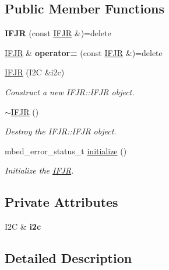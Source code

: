 \subsection*{Public Member Functions}
\begin{DoxyCompactItemize}
\item 
\mbox{\label{class_i_f_j_r_acd1ff6164e8cf8100df187b0abc4e654}} 
{\bfseries I\+F\+JR} (const \mbox{\hyperlink{class_i_f_j_r}{I\+F\+JR}} \&)=delete
\item 
\mbox{\label{class_i_f_j_r_a3d8ba875c73612ed2d426ba80d224c87}} 
\mbox{\hyperlink{class_i_f_j_r}{I\+F\+JR}} \& {\bfseries operator=} (const \mbox{\hyperlink{class_i_f_j_r}{I\+F\+JR}} \&)=delete
\item 
\mbox{\hyperlink{class_i_f_j_r_a1905b6c95f25b84526531afcfeb38b93}{I\+F\+JR}} (I2C \&i2c)
\begin{DoxyCompactList}\small\item\em Construct a new I\+F\+J\+R\+::\+I\+F\+JR object. \end{DoxyCompactList}\item 
\mbox{\hyperlink{class_i_f_j_r_a02cc4eb03b4a7fdacbdb8e7f940b7daa}{$\sim$\+I\+F\+JR}} ()
\begin{DoxyCompactList}\small\item\em Destroy the I\+F\+J\+R\+::\+I\+F\+JR object. \end{DoxyCompactList}\item 
mbed\+\_\+error\+\_\+status\+\_\+t \mbox{\hyperlink{class_i_f_j_r_a0a7d913d00e8573b613b980f17ed2fd4}{initialize}} ()
\begin{DoxyCompactList}\small\item\em Initialize the \mbox{\hyperlink{class_i_f_j_r}{I\+F\+JR}}. \end{DoxyCompactList}\end{DoxyCompactItemize}
\subsection*{Private Attributes}
\begin{DoxyCompactItemize}
\item 
\mbox{\label{class_i_f_j_r_a3af0bc51891b995698609b0e36e0ba2a}} 
I2C \& {\bfseries i2c}
\end{DoxyCompactItemize}


\subsection{Detailed Description}


